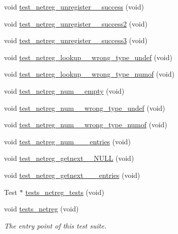 \begin{DoxyCompactItemize}
\item 
void \hyperlink{tests-netreg_8c_a1c0fb895220f707ad6d6299f8b9dd5ce}{test\+\_\+netreg\+\_\+unregister\+\_\+\+\_\+success} (void)
\item 
void \hyperlink{tests-netreg_8c_a4c087b2e5cc35f4170de29a1ea6b3ca3}{test\+\_\+netreg\+\_\+unregister\+\_\+\+\_\+success2} (void)
\item 
void \hyperlink{tests-netreg_8c_abde9861d00490fd1b03ea80785fc4777}{test\+\_\+netreg\+\_\+unregister\+\_\+\+\_\+success3} (void)
\item 
void \hyperlink{tests-netreg_8c_a1cea6faf8ada140b621841010b85a687}{test\+\_\+netreg\+\_\+lookup\+\_\+\+\_\+wrong\+\_\+type\+\_\+undef} (void)
\item 
void \hyperlink{tests-netreg_8c_a5ec24c57bd237c59b8af1add912416da}{test\+\_\+netreg\+\_\+lookup\+\_\+\+\_\+wrong\+\_\+type\+\_\+numof} (void)
\item 
void \hyperlink{tests-netreg_8c_a432586c54dda383011d76e6a0f31012a}{test\+\_\+netreg\+\_\+num\+\_\+\+\_\+empty} (void)
\item 
void \hyperlink{tests-netreg_8c_ae88ff38096c1de71a48f5f20a7f37840}{test\+\_\+netreg\+\_\+num\+\_\+\+\_\+wrong\+\_\+type\+\_\+undef} (void)
\item 
void \hyperlink{tests-netreg_8c_a3af01da8877f7ea543400136f926ffe9}{test\+\_\+netreg\+\_\+num\+\_\+\+\_\+wrong\+\_\+type\+\_\+numof} (void)
\item 
void \hyperlink{tests-netreg_8c_ac65d1a11aa814dac64b8a1541346be0e}{test\+\_\+netreg\+\_\+num\+\_\+\+\_\+\_\+entries} (void)
\item 
void \hyperlink{tests-netreg_8c_a60a84bc6dd5709d7f440f61893a689ac}{test\+\_\+netreg\+\_\+getnext\+\_\+\+\_\+\+N\+U\+LL} (void)
\item 
void \hyperlink{tests-netreg_8c_a8c348d00210aa009da3036358f0c2996}{test\+\_\+netreg\+\_\+getnext\+\_\+\+\_\+\_\+entries} (void)
\item 
Test $\ast$ \hyperlink{tests-netreg_8c_a4e14a773dca6ee6d1ec1cd379c69fefd}{tests\+\_\+netreg\+\_\+tests} (void)
\item 
void \hyperlink{group__unittests_ga9597c8b9433b48f9ce8be48a398bd607}{tests\+\_\+netreg} (void)
\begin{DoxyCompactList}\small\item\em The entry point of this test suite. \end{DoxyCompactList}\end{DoxyCompactItemize}


